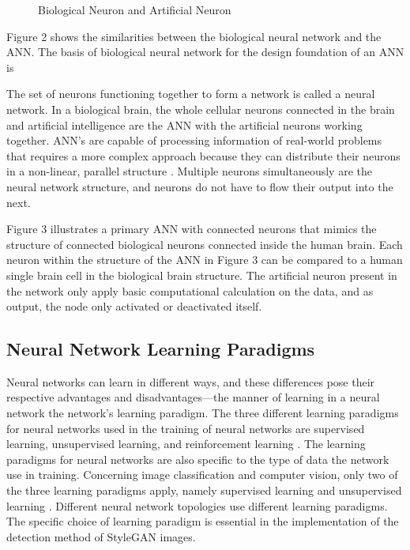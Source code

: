 \begin{figure}[H]%
\centering
{}%
\caption{Biological Neuron and Artificial Neuron \cite{Krenker2011}}%
\label{fig:4}%
\end{figure}

Figure 2 shows the similarities between the biological neural network and the ANN. The basis of biological neural network for the design foundation of an ANN is 

The set of neurons functioning together to form a network is called a neural network. In a biological brain, the whole cellular neurons connected in the brain and artificial intelligence are the ANN with the artificial neurons working together. ANN's are capable of processing information of real-world problems that requires a more complex approach because they can distribute their neurons in a non-linear, parallel structure \citep{Krenker2011}. Multiple neurons simultaneously are the neural network structure, and neurons do not have to flow their output into the next.

Figure 3 illustrates a primary ANN with connected neurons that mimics the structure of connected biological neurons connected inside the human brain. Each neuron within the structure of the ANN in Figure 3 can be compared to a human single brain cell in the biological brain structure. The artificial neuron present in the network only apply basic computational calculation on the data, and as output, the node only activated or deactivated itself.

\subsection{Neural Network Learning Paradigms}

Neural networks can learn in different ways, and these differences pose their respective advantages and disadvantages—the manner of learning in a neural network the network's learning paradigm.  The three different learning paradigms for neural networks used in the training of neural networks are supervised learning, unsupervised learning, and reinforcement learning \citep{Krenker2011}. The learning paradigms for neural networks are also specific to the type of data the network use in training. Concerning image classification and computer vision, only two of the three learning paradigms apply, namely supervised learning and unsupervised learning \citep{OShea2015}. Different neural network topologies use different learning paradigms. The specific choice of learning paradigm is essential in the implementation of the detection method of StyleGAN images. 

